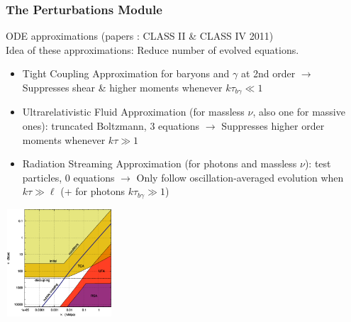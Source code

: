 \begin{frame}[fragile]
	\frametitle{The Perturbations Module}
	
	ODE approximations (papers : CLASS II \& CLASS IV 2011)\\
	
	Idea of these approximations: Reduce number of evolved equations.
	
	\begin{itemize}
		\item Tight Coupling Approximation for baryons and $\gamma$ at 2nd order $\rightarrow$ Suppresses shear \& higher moments whenever $k \tau_{b \gamma} \ll 1$
		\item Ultrarelativistic Fluid Approximation (for massless $\nu$, also one for massive ones): truncated Boltzmann, 3 equations $\rightarrow$ Suppresses higher order moments whenever $k \tau \gg 1$\\
		\item Radiation Streaming Approximation (for photons and massless $\nu$): test particles, 0 equations $\rightarrow$ Only follow oscillation-averaged evolution when $k \tau \gg \ell$ (+ for photons $k \tau_{b \gamma} \gg 1$)
	\end{itemize}
	
	\vspace*{-1\baselineskip}
	{\begin{flushright}
		\includegraphics[width=4cm,height=4cm,angle=0]{Figures/approx_summary.pdf}
	\end{flushright}}
	
\end{frame}



